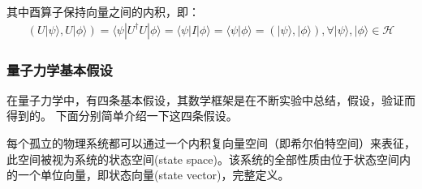 其中酉算子保持向量之间的内积，即：
\begin{align}
    (U|\psi\rangle, U|\phi\rangle) = \langle \psi|U^\dagger U|\phi\rangle = \langle \psi|I|\phi\rangle = \langle \psi|\phi\rangle = (|\psi\rangle, |\phi\rangle), \forall |\psi \rangle, |\phi \rangle\in \mathcal{H}
\end{align}
\subsubsection*{量子力学基本假设}
在量子力学中，有四条基本假设，其数学框架是在不断实验中总结，假设，验证而得到的。
下面分别简单介绍一下这四条假设。
\begin{theorem}\citep{nielsen2010quantum}
    每个孤立的物理系统都可以通过一个内积复向量空间（即希尔伯特空间）来表征，此空间被视为系统的状态空间(state space)。该系统的全部性质由位于状态空间内的一个单位向量，即状态向量(state vector)，完整定义。
\end{theorem}

